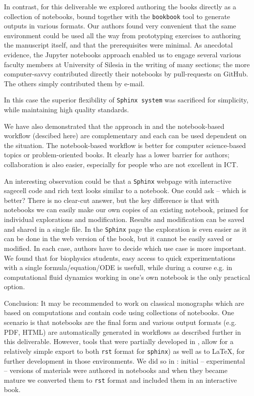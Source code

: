 \documentclass{deliverablereport}
\begin{document}
{{{In contrast, for this deliverable we explored authoring the books
directly as a collection of \Jupyter notebooks, bound together with
the \texttt{bookbook} tool to generate outputs in various formats. Our
authors found very convenient that the same environment could be used
all the way from prototyping exercises to authoring the manuscript
itself, and that the prerequisites were minimal. As anecdotal
evidence, the Jupyter notebooks approach enabled us to engage several
various faculty members at University of Silesia in the writing of
many sections; the more computer-savvy contributed directly their
notebooks by pull-requests on GitHub. The others simply contributed
them by e-mail.


In this case the superior flexibility of \texttt{Sphinx system} was
sacrificed for simplicity, while maintaining high quality standards.


We have also demonstrated that the approach in  and
the notebook-based workflow (descibed here) are complementary and each can be
used dependent on the situation. The notebook-based workflow is better for computer
science-based topics or problem-oriented books. It clearly has a lower barrier
for authors; collaboration is also easier, especially for people who are not
excellent in ICT.

An interesting observation could be that a \texttt{Sphinx} webpage with
interactive sagecell code and rich text looks similar to a \Jupyter notebook.
One could ask -- which is better? There is no clear-cut answer, but the key
difference is that with \Jupyter notebooks we can easily make our own copies of
an existing notebook, primed for individual explorations and modification.
Results and modification can be saved and shared in a single file.  In the
\texttt{Sphinx} page the exploration is even easier as it can be done in the
web version of the book, but it cannot be easily saved or modified. In each
case, authors have to decide which use case is more important. We found that
for biophysics students, easy access to quick experimentations with a single
formula/equation/ODE is usefull, while during a course e.g. in computational
fluid dynamics working in one's own notebook is the only practical option.

Conclusion: It may be recommended to work on classical monographs which
are based on computations and contain code using collections of
notebooks. One scenario is that notebooks are the final form and
various output formats (e.g. PDF, HTML) are automatically generated
in workflows as described further in this deliverable. However, tools
that were partially developed in \ODK, allow for a relatively simple
export to both \texttt{rst} format for \texttt{sphinx}) as well as to
\LaTeX, for further development in those environments. We did so in
: initial -- experimental -- versions of
materials were authored in notebooks and when they became mature we
converted them to \texttt{rst} format and included them in an interactive
book.

}}}
\end{document}
